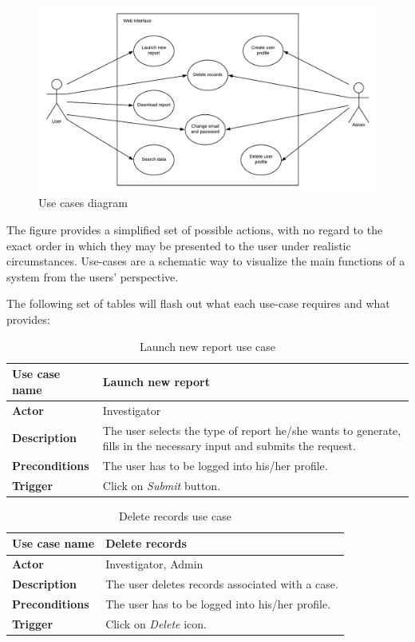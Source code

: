 \begin{figure}[h!]
\centering
\includegraphics[scale=0.6]{imgs/UseCasesDiag.pdf}
\caption{Use cases diagram}
\label{fig:usecases}
\end{figure}

The figure provides a simplified set of possible actions, with no regard to the
exact order in which they may be presented to the user under realistic
circumstances. Use-cases are a schematic way to visualize the main functions of a
system from the users' perspective.

The following set of tables will flash out what each use-case requires and what
provides:

\begin{table}[H]
\centering
\begin{tabular}{l p{9cm}}  
\toprule
\bf{Use case name}    & Launch new report \\
\midrule
\bf{Actor}    & Investigator \\
\midrule
\bf{Description}    & The user selects the type of report he/she wants to
generate, fills in the necessary input and submits the request. \\
\midrule
\bf{Preconditions}    & The user has to be logged into his/her profile. \\
\midrule
\bf{Trigger}    & Click on \emph{Submit} button. \\
\bottomrule
\end{tabular}
\caption{Launch new report use case}
\end{table}

\begin{table}[H]
\centering
\begin{tabular}{l p{9cm}}  
\toprule
\bf{Use case name}    & Delete records \\
\midrule
\bf{Actor}    & Investigator, Admin \\
\midrule
\bf{Description}    & The user deletes records associated with a case. \\
\midrule
\bf{Preconditions}    & The user has to be logged into his/her profile. \\
\midrule
\bf{Trigger}    & Click on \emph{Delete} icon. \\
\bottomrule
\end{tabular}
\caption{Delete records use case}
\end{table}

